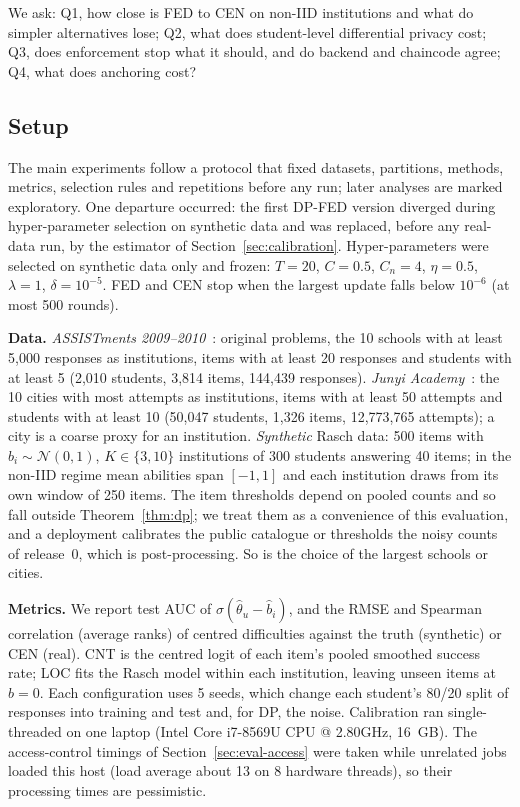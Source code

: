 \documentclass[pdflatex,iicol,sn-mathphys-num]{sn-jnl}
\makeatletter
\theoremstyle{thmstyleone}
\newcommand{\AssistItems}{3,814}
\newcommand{\AssistNSchools}{10}
\newcommand{\AssistResp}{144,439}
\newcommand{\AssistUsers}{2,010}
\newcommand{\HostCPU}{Intel Core i7-8569U CPU @ 2.80GHz}
\newcommand{\HostRAM}{16}
\newcommand{\HpC}{0.5}
\newcommand{\HpCn}{4}
\newcommand{\HpLr}{0.5}
\newcommand{\HpT}{20}
\newcommand{\JunyiItems}{1,326}
\newcommand{\JunyiNCities}{10}
\newcommand{\JunyiResp}{12,773,765}
\newcommand{\JunyiUsers}{50,047}
\newcommand{\NSeeds}{5}
\makeatother
\begin{document}
We ask: Q1, how close is FED to CEN on non-IID institutions and what do simpler alternatives lose; Q2, what does student-level differential privacy cost; Q3, does enforcement stop what it should, and do backend and chaincode agree; Q4, what does anchoring cost?

\subsection{Setup}\label{sec:setup}
The main experiments follow a protocol that fixed datasets, partitions, methods, metrics, selection rules and repetitions before any run; later analyses are marked exploratory. One departure occurred: the first DP-FED version diverged during hyper-parameter selection on synthetic data and was replaced, before any real-data run, by the estimator of Section~\ref{sec:calibration}. Hyper-parameters were selected on synthetic data only and frozen: $T=\HpT$, $C=\HpC$, $C_n=\HpCn$, $\eta=\HpLr$, $\lambda=1$, $\delta=10^{-5}$. FED and CEN stop when the largest update falls below $10^{-6}$ (at most 500 rounds).

\textbf{Data.} \emph{ASSISTments 2009--2010}~\cite{feng2009addressing}: original problems, the \AssistNSchools{} schools with at least 5{,}000 responses as institutions, items with at least 20 responses and students with at least 5 (\AssistUsers{} students, \AssistItems{} items, \AssistResp{} responses). \emph{Junyi Academy}~\cite{junyi2020dataset,chang2015modeling}: the \JunyiNCities{} cities with most attempts as institutions, items with at least 50 attempts and students with at least 10 (\JunyiUsers{} students, \JunyiItems{} items, \JunyiResp{} attempts); a city is a coarse proxy for an institution. \emph{Synthetic} Rasch data: 500 items with $b_i\sim\mathcal{N}(0,1)$, $K\in\{3,10\}$ institutions of 300 students answering 40 items; in the non-IID regime mean abilities span $[-1,1]$ and each institution draws from its own window of 250 items. The item thresholds depend on pooled counts and so fall outside Theorem~\ref{thm:dp}; we treat them as a convenience of this evaluation, and a deployment calibrates the public catalogue or thresholds the noisy counts of release~0, which is post-processing. So is the choice of the largest schools or cities.

\textbf{Metrics.} We report test AUC of $\sigma(\hat\theta_u-\hat b_i)$, and the RMSE and Spearman correlation (average ranks) of centred difficulties against the truth (synthetic) or CEN (real). CNT is the centred logit of each item's pooled smoothed success rate; LOC fits the Rasch model within each institution, leaving unseen items at $b=0$. Each configuration uses \NSeeds{} seeds, which change each student's 80/20 split of responses into training and test and, for DP, the noise. Calibration ran single-threaded on one laptop (\HostCPU{}, \HostRAM{}~GB). The access-control timings of Section~\ref{sec:eval-access} were taken while unrelated jobs loaded this host (load average about 13 on 8 hardware threads), so their processing times are pessimistic.
\end{document}
